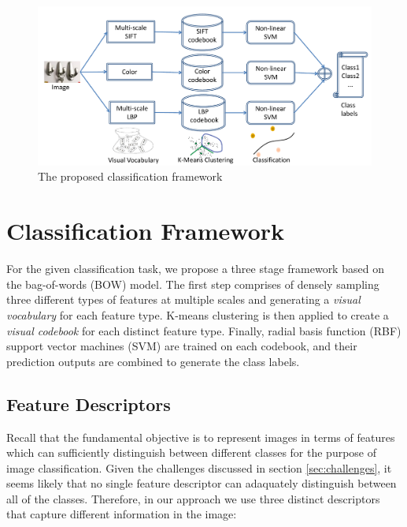 \documentclass[12pt]{article}
\begin{document}
\begin{figure}
\includegraphics[width = 1\textwidth]{flowchart}
\caption{The proposed classification framework}
\end{figure}

\section{Classification Framework}
For the given classification task, we propose a three stage framework based on the bag-of-words (BOW) model.
The first step comprises of densely sampling three different types of features at multiple scales and generating a \textit{visual vocabulary} for each feature type.
K-means clustering is then applied to create a \textit{visual codebook} for each distinct feature type.
Finally, radial basis function (RBF) support vector machines (SVM) are trained on each codebook, and their prediction outputs are combined to generate the class labels.

\subsection{Feature Descriptors}
Recall that the fundamental objective is to represent images in terms of features which can sufficiently distinguish between different classes for the purpose of image classification.
Given the challenges discussed in section \ref{sec:challenges}, it seems likely that no single feature descriptor can adaquately distinguish between all of the classes.
Therefore, in our approach we use three distinct descriptors that capture different information in the image:
\end{document}
